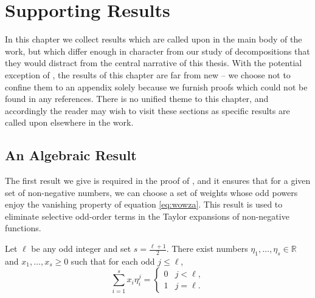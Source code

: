 \documentclass[oneside,hidelinks,indentfirst,10pt]{book}
\begin{document}
\chapter{Supporting Results}\label{chap:alg}


In this chapter we collect results which are called upon in the main body of the work, but which differ enough in character from our study of decompositions that they would distract from the central narrative of this thesis. With the potential exception of , the results of this chapter are far from new -- we choose not to confine them to an appendix solely because we furnish proofs which could not be found in any references. There is no unified theme to this chapter, and accordingly the reader may wish to visit these sections as specific results are called upon elsewhere in the work.


\section{An Algebraic Result}


The first result we give is required in the proof of , and it ensures that for a given set of non-negative numbers, we can choose a set of weights whose odd powers enjoy the vanishing property of equation \eqref{eq:wowza}. This result is used to eliminate selective odd-order terms in the Taylor expansions of non-negative functions. 


\begin{thm}\label{thm:specialodds}
Let \(\ell\) be any odd integer and set \(s=\frac{\ell+1}{2}\). There exist numbers \(\eta_1,\dots,\eta_s\in\mathbb{R}\) and \(x_1,\dots,x_s\geq 0\) such that for each odd \(j\leq \ell\),
\begin{equation}\label{eq:wowza}
    \sum_{i=1}^sx_i\eta_i^j=\begin{cases}
    0 & j<\ell,\\
    1 & j=\ell.
    \end{cases}
\end{equation}
\end{thm}
\end{document}
